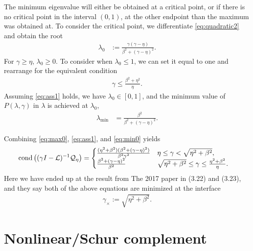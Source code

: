 \documentclass[a4paper,10pt]{article}
\begin{document}
The minimum eigenvalue will either be obtained at a critical point, or if there is
no critical point in the interval $(0,1)$, at the other endpoint than the maximum
was obtained at. To consider the critical point, we differentiate \eqref{eq:quadratic2}
and obtain the root
%
\begin{align}\label{eq:lambda_0}
\lambda_0 &:= \frac{\gamma(\gamma-\eta)}{\beta^2+(\gamma-\eta)^2}.
\end{align}
%
For $\gamma \geq \eta$, $\lambda_0 \geq 0$. To consider when $\lambda_0\leq 1$, we can
set it equal to one and rearrange for the equivalent condition
%
\begin{align}\label{eq:ass1}
\gamma \leq \frac{\beta^2+\eta^2}{\eta}.
\end{align}
%
Assuming \eqref{eq:ass1} holds, we have $\lambda_0 \in[0,1]$, and
the minimum value of $P(\lambda,\gamma)$ in $\lambda$ is achieved at $\lambda_0$,
%
\begin{align}\label{eq:min0}
\lambda_{\min} & = \frac{\beta^2}{\beta^2 + (\gamma-\eta)^2}.
\end{align}
%

Combining \eqref{eq:max0}, \eqref{eq:ass1}, and \eqref{eq:min0} yields
%
\begin{align}\label{eq:cases0}
\textnormal{cond}\left((\gamma I- {\mathcal{L}})^{-1}\mathcal{Q}_\eta\right) & =
\begin{cases} 
	\frac{(\eta^2+\beta^2)(\beta^2 + (\gamma-\eta)^2)}
		{\beta^2\gamma^2}
		& \eta \leq \gamma < \sqrt{\eta^2+\beta^2}, \\
	\frac{\beta^2 + (\gamma-\eta)^2}{\beta^2}
		& \sqrt{\eta^2+\beta^2} \leq \gamma \leq \frac{\eta^2+\beta^2}{\eta}.
	\end{cases}
\end{align}
%
Here we have ended up at the result from The 2017 paper in (3.22) and (3.23),
and they say both of the above equations are minimized at the interface
%
\begin{align}\label{eq:gamma_opt0}
\gamma_\times := \sqrt{\eta^2+\beta^2}.
\end{align}
%

\section{Nonlinear/Schur complement}
\end{document}
